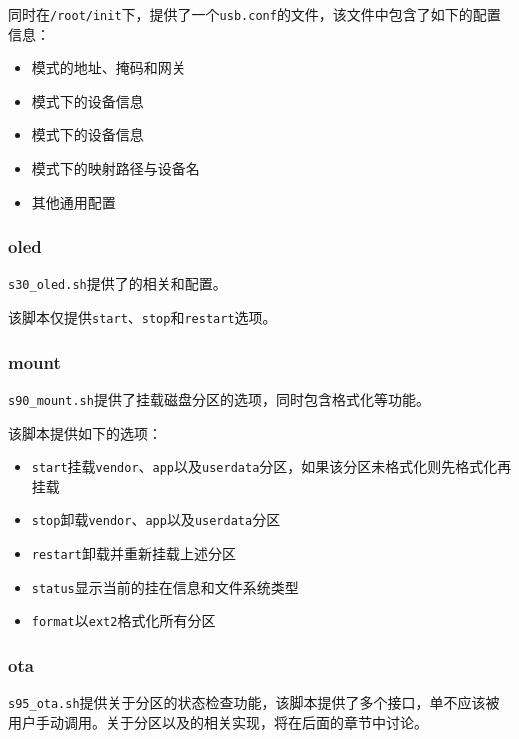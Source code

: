 \documentclass[UTF8]{ctexart}
\newcommand{\code}[1]{\colorbox{gray!10}{\lstinline[style=inlinecode]|#1|}}
\begin{document}
同时在\code{/root/init}下，提供了一个\code{usb.conf}的文件，该文件中包含了如下的配置信息：

\begin{itemize}
    \item {}模式的地址、掩码和网关
    \item {}模式下的设备信息
    \item {}模式下的设备信息
    \item {}模式下的映射路径与设备名
    \item 其他通用配置
\end{itemize}

\subsubsection{oled}

\code{s30_oled.sh}提供了的相关和配置。

该脚本仅提供\code{start}、\code{stop}和\code{restart}选项。

\subsubsection{mount}

\code{s90_mount.sh}提供了挂载磁盘分区的选项，同时包含格式化等功能。

该脚本提供如下的选项：

\begin{itemize}
    \item \code{start}挂载\code{vendor}、\code{app}以及\code{userdata}分区，如果该分区未格式化则先格式化再挂载
    \item \code{stop}卸载\code{vendor}、\code{app}以及\code{userdata}分区
    \item \code{restart}卸载并重新挂载上述分区
    \item \code{status}显示当前的挂在信息和文件系统类型
    \item \code{format}以\code{ext2}格式化所有分区
\end{itemize}

\subsubsection{ota}

\code{s95_ota.sh}提供关于分区的状态检查功能，该脚本提供了多个接口，单不应该被用户手动调用。关于分区以及的相关实现，将在后面的章节中讨论。
\end{document}

